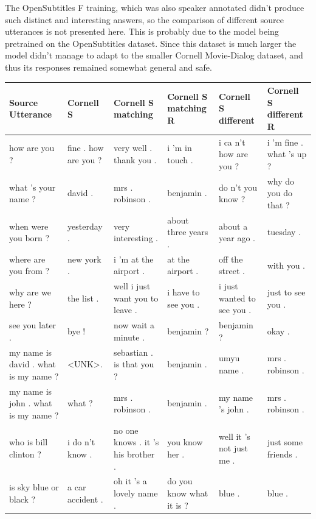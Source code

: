 \documentclass[12pt]{article}
\begin{document}
The OpenSubtitles F training, which was also speaker annotated didn't produce such distinct and interesting answers, so the comparison of different source utterances is not presented here. This is probably due to the model being pretrained on the OpenSubtitles dataset. Since this dataset is much larger the model didn't manage to adapt to the smaller Cornell Movie-Dialog dataset, and thus its responses remained somewhat general and safe.


\begin{table}[H]
	\centering
	\begin{tabular}{|L{2.3cm}|L{2.3cm}|L{2.3cm}|L{2.3cm}|L{2.3cm}|L{2.3cm}|}
		\hline
		\textbf{Source Utterance} & \textbf{Cornell S} & \textbf{Cornell S matching} & \textbf{Cornell S matching R} & \textbf{Cornell S different} & \textbf{Cornell S different R}\\ \hline
		how are you ? & fine . how are you ? & very well . thank you . & i 'm in touch . & i ca n't how are you ? & i 'm fine . what 's up ?
		\\ \hline
		what 's your name ? & david . & mrs . robinson . & benjamin . & do n't you know ? & why do you do that ?
		\\ \hline
		when were you born ? & yesterday . & very interesting . & about three years . & about a year ago . & tuesday .
		\\ \hline
		where are you from ? & new york . & i 'm at the airport . & at the airport . & off the street . & with you .
		\\ \hline
		why are we here ? & the list . & well i just want you to leave . & i have to see you . & i just wanted to see you . & just to see you .
		\\ \hline
		see you later . & bye ! & now wait a minute . & benjamin ? & benjamin ? & okay .
		\\ \hline
		my name is david . what is my name ? & \textless UNK\textgreater . & sebastian . is that you ? & benjamin . & umyu name . & mrs . robinson .
		\\ \hline
		my name is john . what is my name ? & what ? & mrs . robinson . & benjamin . & my name 's john . & mrs . robinson .
		\\ \hline
		who is bill clinton ? & i do n't know . & no one knows . it 's his brother . & you know her . & well it 's not just me . & just some friends .
		\\ \hline
		is sky blue or black ? & a car accident . & oh it 's a lovely name . & do you know what it is ? & blue . & blue .
		\\ \hline

\end{tabular}
\end{table}
\end{document}
